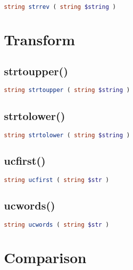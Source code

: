 \begin{lstlisting}[language=PHP]
string strrev ( string $string )
\end{lstlisting}

\section{Transform}


\subsection{strtoupper()}



\begin{lstlisting}[language=PHP]
string strtoupper ( string $string )
\end{lstlisting}

\subsection{strtolower()}




\begin{lstlisting}[language=PHP]
string strtolower ( string $string )
\end{lstlisting}

\subsection{ucfirst()}





\begin{lstlisting}[language=PHP]
string ucfirst ( string $str )
\end{lstlisting}


\subsection{ucwords()}




\begin{lstlisting}[language=PHP]
string ucwords ( string $str )
\end{lstlisting}



\section{Comparison}

